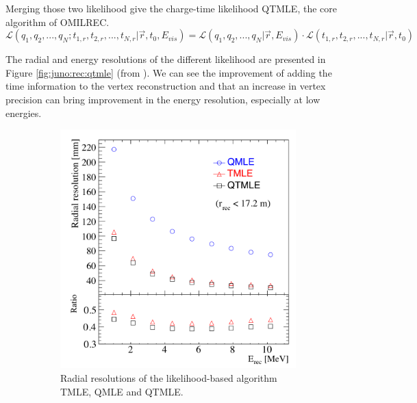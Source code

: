 \documentclass[../main.tex]{subfiles}
\begin{document}
Merging those two likelihood give the charge-time likelihood QTMLE, the core algorithm of OMILREC.
\begin{equation}
  \mathcal{L}(q_1, q_2, ..., q_N; t_{1,r}, t_{2,r}, ..., t_{N,r} | \vec{r}, t_0 , E_{vis}) = \mathcal{L}(q_1, q_2, ..., q_N | \vec{r}, E_{vis}) \cdot \mathcal{L}(t_{1,r}, t_{2,r}, ..., t_{N,r} | \vec{r}, t_0)
\end{equation}

The radial and energy resolutions of the different likelihood are presented in Figure \ref{fig:juno:rec:qtmle} (from \cite{huang_data-driven_2023}). We can see the improvement of adding the time information to the vertex reconstruction and that an increase in vertex precision can bring improvement in the energy resolution, especially at low energies.

\begin{figure}[ht]
  \begin{subfigure}{0.48\linewidth}
    \centering
    \includegraphics[width=\textwidth]{images/juno/reco/radial_qtmle.png}
    \caption{Radial resolutions of the likelihood-based algorithm TMLE, QMLE and QTMLE.}
  \end{subfigure}
  \hfill
  \begin{subfigure}{0.48\linewidth}
    \centering

\end{subfigure}
\end{figure}
\end{document}
